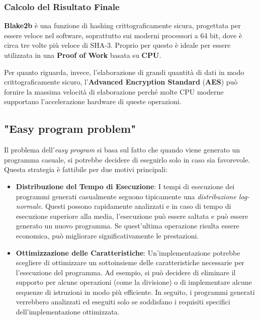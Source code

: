 \subsubsection{Calcolo del Risultato Finale}
\textbf{Blake2b} è una funzione di hashing crittograficamente sicura, progettata per essere veloce nel software, soprattutto sui moderni processori a 64 bit, dove è circa tre volte più veloce di SHA-3. Proprio per questo è ideale per essere utilizzata in una \textbf{Proof of Work} basata su \textbf{CPU}.

Per quanto riguarda, invece, l'elaborazione di grandi quantità di dati in modo crittograficamente sicuro, l'\textbf{Advanced Encryption Standard }(\textbf{AES}) può fornire la massima velocità di elaborazione perché molte CPU moderne supportano l'accelerazione hardware di queste operazioni.

\subsection{"Easy program problem"}
Il problema dell'\textit{easy program} si basa sul fatto che quando viene generato un programma casuale, si potrebbe decidere di eseguirlo solo in caso sia favorevole. Questa strategia è fattibile per due motivi principali:

\begin{itemize}
    \item \textbf{Distribuzione del Tempo di Esecuzione}: I tempi di esecuzione dei programmi generati casualmente seguono tipicamente una \textit{distribuzione log-normale}. Questi possono rapidamente analizzati e in caso di tempo di esecuzione superiore alla media, l'esecuzione può essere saltata e può essere generato un nuovo programma. Se quest'ultima operazione risulta essere economica, può migliorare significativamente le prestazioni.
    \item \textbf{Ottimizzazione delle Caratteristiche}: Un'implementazione potrebbe scegliere di ottimizzare un sottoinsieme delle caratteristiche necessarie per l'esecuzione del programma. Ad esempio, si può decidere di eliminare il supporto per alcune operazioni (come la divisione) o di implementare alcune sequenze di istruzioni in modo più efficiente. In seguito, i programmi generati verrebbero analizzati ed eseguiti solo se soddisfano i requisiti specifici dell'implementazione ottimizzata.
\end{itemize}

